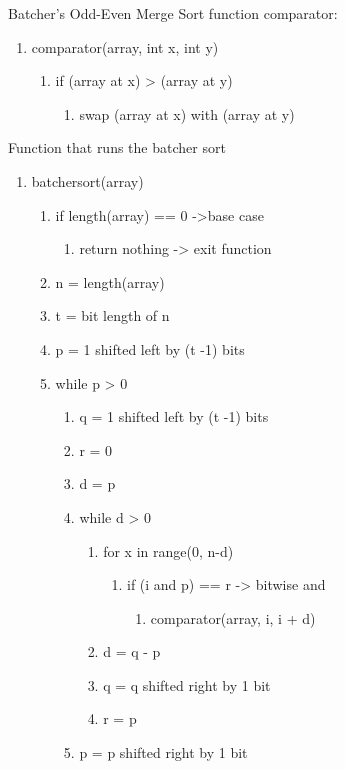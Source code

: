 \documentclass[11pt]{article}
\begin{document}
Batcher's Odd-Even Merge Sort
function comparator:
\begin{enumerate}
\item comparator(array, int x, int y)
	\begin{enumerate}
	\item if (array at x) > (array at y)
		\begin{enumerate}
		\item swap (array at x) with (array at y)
		\end{enumerate}
	\end{enumerate}
\end{enumerate}
Function that runs the batcher sort
\begin{enumerate}
\item batchersort(array)
	\begin{enumerate}
	\item if length(array) == 0 ->base case
		\begin{enumerate}
		\item return nothing -> exit function
		\end{enumerate}
	\item n = length(array)
	\item t = bit length of n
	\item p = 1 shifted left by (t -1) bits
	\item while p > 0
		\begin{enumerate}
		\item q = 1 shifted left by (t -1) bits
		\item r = 0
		\item d = p
		\item while d > 0
			\begin{enumerate}
			\item for x in range(0, n-d)
				\begin{enumerate}
				\item if (i and p) == r -> bitwise and
				\begin{enumerate}
				\item comparator(array, i, i + d)
				\end{enumerate}
				\end{enumerate}
			\item d = q - p
			\item q = q shifted right by 1 bit
			\item r = p
			\end{enumerate}
		\item p = p shifted right by 1 bit
		\end{enumerate}
	\end{enumerate}
\end{enumerate}
\end{document}
